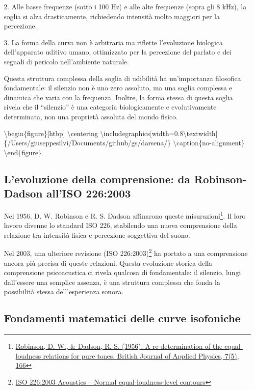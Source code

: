 \documentclass[a4paper,11pt]{article}
\begin{document}
2. Alle basse frequenze (sotto i 100 Hz) e alle alte frequenze (sopra
gli 8 kHz), la soglia si alza drasticamente, richiedendo intensità molto
maggiori per la percezione.

3. La forma della curva non è arbitraria ma riflette l'evoluzione
biologica dell'apparato uditivo umano, ottimizzato per la percezione del
parlato e dei segnali di pericolo nell'ambiente naturale.

Questa struttura complessa della soglia di udibilità ha un'importanza
filosofica fondamentale: il silenzio non è uno zero assoluto, ma una
soglia complessa e dinamica che varia con la frequenza. Inoltre, la
forma stessa di questa soglia rivela che il ``silenzio'' è una categoria
biologicamente e evolutivamente determinata, non una proprietà assoluta
del mondo fisico.

\textbackslash{}begin\{figure\}{[}htbp{]}
  \textbackslash{}centering
  \textbackslash{}includegraphics{[}width=0.8\textbackslash{}textwidth{]}\{/Users/giuseppesilvi/Documents/github/gs/darsena/\}
  \textbackslash{}caption\{no-alignment\}
\textbackslash{}end\{figure\}

\subsection{L'evoluzione della comprensione: da Robinson-Dadson all'ISO 226:2003}\hypertarget{levoluzione-della-comprensione-da-robinson-dadson-alliso-2262003}{}\label{levoluzione-della-comprensione-da-robinson-dadson-alliso-2262003}

Nel 1956, D. W. Robinson e R. S. Dadson affinarono queste
misurazioni\footnote{\href{https://doi.org/10.1121/1.1919119}{Robinson, D. W., \& Dadson, R. S. (1956). A re-determination of
the equal-loudness relations for pure tones. British Journal of
Applied Physics, 7(5), 166}}. Il loro lavoro divenne lo standard ISO 226, stabilendo
una nuova comprensione della relazione tra intensità fisica e percezione
soggettiva del suono.

Nel 2003, una ulteriore revisione (ISO 226:2003)\footnote{\href{https://www.iso.org/standard/34222.html}{ISO 226:2003 Acoustics -- Normal equal-loudness-level
contours}} ha portato a una
comprensione ancora più precisa di queste relazioni. Questa evoluzione
storica della comprensione psicoacustica ci rivela qualcosa di
fondamentale: il silenzio, lungi dall'essere una semplice assenza, è una
struttura complessa che fonda la possibilità stessa dell'esperienza
sonora.

\subsection{Fondamenti matematici delle curve isofoniche}\hypertarget{fondamenti-matematici-delle-curve-isofoniche}{}\label{fondamenti-matematici-delle-curve-isofoniche}
\end{document}

